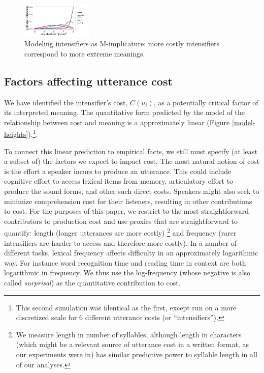 \documentclass[10pt,letterpaper]{article}
\begin{document}
\begin{figure}[ht]
\begin{center}
\includegraphics[width=0.3\textwidth]{analysis_files_for_writeup/images/model_results.pdf}
\end{center}
\caption{Modeling intensifiers as M-implicature: more costly intensifiers correspond to more extreme meanings.} 
\label{model}
\end{figure}

\subsection{Factors affecting utterance cost}

We have identified the intensifier's cost, $C(u_{i})$, as a potentially critical factor of its interpreted meaning. The quantitative form predicted by the model of the relationship between cost and meaning is a approximately linear (Figure \ref{model-heights}).\footnote{This second simulation was identical as the first, except run on a more discretized scale for 6 different utterance costs (or ``intensifiers'').}.

To connect this linear prediction to empirical facts, we still must specify (at least a subset of) the factors we expect to impact cost.
The most natural notion of cost is the effort a speaker incurs to produce an utterance. This could include cognitive effort to access lexical items from memory, articulatory effort to produce 
the sound forms, and other such direct costs.
Speakers might also seek to minimize comprehension cost for their listeners, resulting in other contributions to cost. 
For the purposes of this paper, we restrict to the most
straightforward contributors to production cost and use proxies that are straightforward to quantify: length (longer utterances are more costly)
\footnote{We measure length in number of syllables, although length in characters (which might be a relevant source of utterance cost in a written format, as our experiments were in) has similar predictive power to syllable length in all of our analyses.}
and frequency (rarer intensifiers are harder to access and therefore more costly).
In a number of different tasks, lexical frequency affects difficulty in an approximately logarithmic way. For instance word recognition time \cite{McCusker1977} 
and reading time in context \cite{smithLevy} are both logarithmic in frequency. We thus use the log-frequency (whose negative is also called \emph{surprisal}) as the quantitative contribution to cost.
\end{document}
